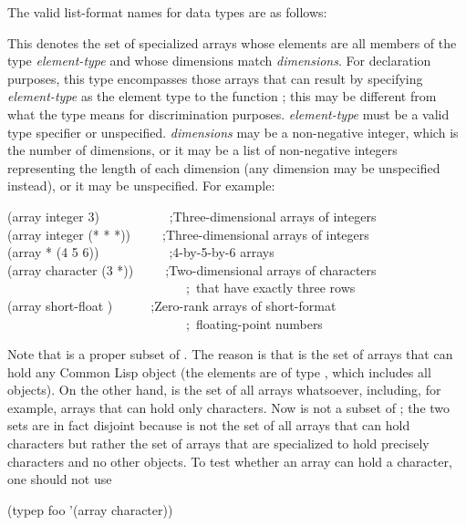 The valid list-format names for data types are as follows:

\begin{flushdesc}
\item[\cd{(array \emph{element-type} \emph{dimensions})}]
This denotes the set
of specialized arrays
whose elements are all members of the type \emph{element-type}
and whose dimensions match \emph{dimensions}.
For declaration purposes, this type encompasses those arrays
that can result by specifying \emph{element-type} as the element type
to the function ; this may be different
from what the type means for discrimination purposes.
\emph{element-type} must be a valid type specifier or unspecified.
\emph{dimensions} may be a non-negative integer, which is the number
of dimensions, or it may be a list of non-negative integers
representing the length of each dimension (any dimension
may be unspecified instead), or it may be unspecified.
For example:
\begin{lisp}
(array integer 3)~~~~~~~~~~~;\textrm{Three-dimensional arrays of integers} \\
(array integer (* * *))~~~~~;\textrm{Three-dimensional arrays of integers} \\
(array * (4 5 6))~~~~~~~~~~~;\textrm{4-by-5-by-6 arrays} \\
(array character (3 *))~~~~~;\textrm{Two-dimensional arrays of characters} \\
~~~~~~~~~~~~~~~~~~~~~~~~~~~~;~\textrm{that have exactly three rows} \\
(array short-float {\emptylist})~~~~~~;\textrm{Zero-rank arrays of short-format} \\
~~~~~~~~~~~~~~~~~~~~~~~~~~~~;~\textrm{floating-point numbers}
\end{lisp}
Note that  is a proper subset of .
The reason is that  is the set of arrays that can
hold any Common Lisp object (the elements are of type ,
which includes all objects).  On the other hand, 
is the set of all arrays whatsoever, including, for example,
arrays that can hold only characters.  Now
 is not a subset of ; the two sets
are in fact disjoint because  is not the
set of all arrays that can hold characters but rather the set of
arrays that are specialized to hold precisely characters and no
other objects.  To test whether an array  can hold a character,
one should not use
\begin{lisp}
(typep foo '(array character))

\end{lisp}
\end{flushdesc}
